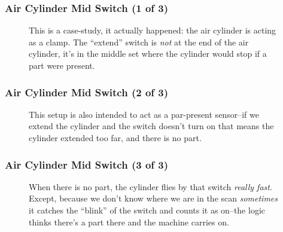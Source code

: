 \begin{frame}
    \frametitle{Air Cylinder Mid Switch (1 of 3)}

    \begin{figure}
        \centering
        \resizebox{0.5\linewidth}{!}{
            
        }

        \vspace{0.5em}
        {\footnotesize This is a case-study, it actually happened: the air cylinder is acting as a clamp. The ``extend'' switch is \emph{not} at the end of the air cylinder, it's in the middle set where the cylinder would stop if a part were present.\par}
    \end{figure}
\end{frame}

\begin{frame}
    \frametitle{Air Cylinder Mid Switch (2 of 3)}

    \begin{figure}
        \centering
        \resizebox{0.5\linewidth}{!}{
            
        }

        \vspace{0.5em}
        {\footnotesize This setup is also intended to act as a par-present sensor--if we extend the cylinder and the switch doesn't turn on that means the cylinder extended too far, and there is no part.\par}
    \end{figure}
\end{frame}

\begin{frame}
    \frametitle{Air Cylinder Mid Switch (3 of 3)}

    \begin{figure}
        \centering
        \resizebox{0.5\linewidth}{!}{
            
        }

        \vspace{0.5em}
        {\footnotesize When there is no part, the cylinder flies by that switch \emph{really fast}. Except, because we don't know where we are in the scan \emph{sometimes} it catches the ``blink'' of the switch and counts it as on--the logic thinks there's a part there and the machine carries on.\par}
    \end{figure}
\end{frame}

